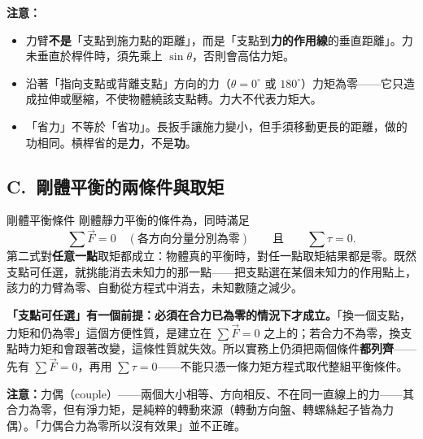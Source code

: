 \documentclass[11pt]{article}
\begin{document}

\textbf{注意：}
\begin{itemize}\setlength{\itemsep}{1pt}
\item 力臂\textbf{不是}「支點到施力點的距離」，而是「支點到\textbf{力的作用線}的垂直距離」。力未垂直於桿件時，須先乘上 $\sin\theta$，否則會高估力矩。
\item 沿著「指向支點或背離支點」方向的力（$\theta=0^\circ$ 或 $180^\circ$）力矩為零——它只造成拉伸或壓縮，不使物體繞該支點轉。力大不代表力矩大。
\item 「省力」不等於「省功」。長扳手讓施力變小，但手須移動更長的距離，做的功相同。槓桿省的是\textbf{力}，不是\textbf{功}。
\end{itemize}

\subsection*{\sffamily C.\ 剛體平衡的兩條件與取矩}

\begin{補充框}{剛體平衡條件}
剛體靜力平衡的條件為，同時滿足
$$\sum \vec F = 0 \quad(\text{各方向分量分別為零})\qquad\text{且}\qquad \sum \tau = 0.$$
第二式對\textbf{任意一點}取矩都成立：物體真的平衡時，對任一點取矩結果都是零。既然支點可任選，就挑能消去未知力的那一點——把支點選在某個未知力的作用點上，該力的力臂為零、自動從方程式中消去，未知數隨之減少。

\textbf{「支點可任選」有一個前提：必須在合力已為零的情況下才成立。}「換一個支點，力矩和仍為零」這個方便性質，是建立在 $\sum\vec F=0$ 之上的；若合力不為零，換支點時力矩和會跟著改變，這條性質就失效。所以實務上仍須把兩個條件\textbf{都列齊}——先有 $\sum\vec F=0$，再用 $\sum\tau=0$——不能只憑一條力矩方程式取代整組平衡條件。
\end{補充框}


\textbf{注意：}力偶（couple）——兩個大小相等、方向相反、不在同一直線上的力——其合力為零，但有淨力矩，是純粹的轉動來源（轉動方向盤、轉螺絲起子皆為力偶）。「力偶合力為零所以沒有效果」並不正確。
\end{document}
